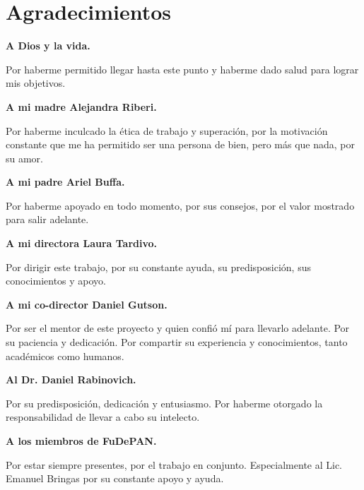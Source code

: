 \chapter*{Agradecimientos} 



\par \textbf{A Dios y la vida.}
\par Por haberme permitido llegar hasta este punto y haberme dado salud para lograr mis objetivos. \\

\par \textbf{A mi madre Alejandra Riberi.}
\par Por haberme inculcado la ética de trabajo y superación, por la motivación constante que me ha permitido ser una persona de bien, pero más que nada, por su amor. \\

\par \textbf{A mi padre Ariel Buffa.}
\par Por haberme apoyado en todo momento, por sus consejos, por el valor mostrado para salir adelante. \\

\par \textbf{A mi directora Laura Tardivo.}
\par Por dirigir este trabajo, por su constante ayuda, su predisposición, sus conocimientos y apoyo. \\

\par \textbf{A mi co-director Daniel Gutson.}
\par Por ser el mentor de este proyecto y quien confió mí para llevarlo adelante. Por su paciencia y dedicación. Por compartir su experiencia y conocimientos, tanto académicos como humanos. \\

\par \textbf{Al Dr. Daniel Rabinovich.}
\par Por su predisposición, dedicación y entusiasmo. Por haberme otorgado la responsabilidad de llevar a cabo su intelecto. \\

\par \textbf{A los miembros de FuDePAN.}
\par Por estar siempre presentes, por el trabajo en conjunto. Especialmente al Lic. Emanuel Bringas por su constante apoyo y ayuda. \\

